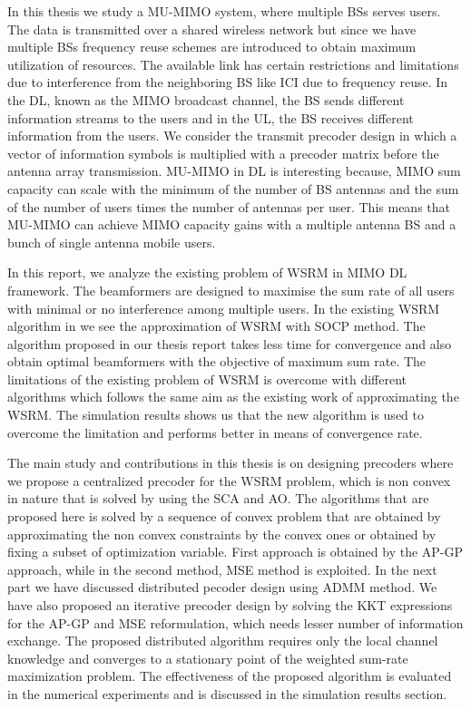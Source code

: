 In this thesis we study a \ac{MU-MIMO} system, where multiple \ac{BS}s serves users. The data is transmitted over a shared wireless network but since we have multiple \ac{BS}s frequency reuse schemes are introduced to obtain maximum utilization of resources. The available link has certain restrictions and limitations due to interference from the neighboring \ac{BS} like \ac{ICI} due to frequency reuse. In the \ac{DL}, known as the \ac{MIMO} broadcast channel, the \ac{BS} sends different information streams to the users and in the \ac{UL}, the \ac{BS} receives different information from the users. We consider the transmit precoder design in which a vector of information symbols is multiplied with a precoder matrix before the antenna array transmission. \ac{MU-MIMO} in \ac{DL} is interesting because, \ac{MIMO} sum capacity can scale with the minimum of the number of \ac{BS} antennas and the sum of the number of users times the number of antennas per user. This means that \ac{MU-MIMO} can achieve \ac{MIMO} capacity gains with a multiple antenna \ac{BS} and a bunch of single antenna mobile users.

In this report, we analyze the existing problem of \ac{WSRM} in \ac{MIMO} \ac{DL} framework. The beamformers are designed to maximise the sum rate of all users with minimal or no interference among multiple users. In the existing \ac{WSRM} algorithm in \cite{tran2012fast} we see the approximation of \ac{WSRM} with \ac{SOCP} method. The algorithm proposed in our thesis report takes less time for convergence and also obtain optimal beamformers with the objective of maximum sum rate. The limitations of the existing problem of \ac{WSRM} is overcome with different algorithms which follows the same aim as the existing work of approximating the \ac{WSRM}. The simulation results shows us that the new algorithm is used to overcome the limitation and performs better in means of convergence rate.

The main study and contributions in this thesis is on designing precoders where we propose a centralized precoder for the \ac{WSRM} problem, which is non convex in nature that is solved by using the \ac{SCA} and \ac{AO}. The algorithms that are proposed here is solved by a sequence of convex problem that are obtained by approximating the non convex constraints by the convex ones or obtained by fixing a subset of optimization variable. First approach is obtained by the \ac{AP-GP} approach, while in the second method, \ac{MSE} method is exploited. In the next part we have discussed distributed pecoder design using \ac{ADMM} method. We have also proposed an iterative precoder design by solving the \ac{KKT} expressions for the \ac{AP-GP} and \ac{MSE} reformulation, which needs lesser number of information exchange. The proposed distributed algorithm requires only the local channel knowledge and converges to a stationary point of the weighted sum-rate maximization problem. The effectiveness of the proposed algorithm is evaluated in the numerical experiments and is discussed in the simulation results section.

